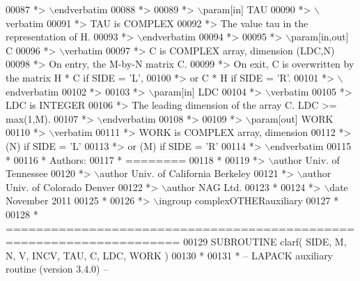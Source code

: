 \begin{DoxyCode}
00087 \textcolor{comment}{*> \(\backslash\)endverbatim}
00088 \textcolor{comment}{*>}
00089 \textcolor{comment}{*> \(\backslash\)param[in] TAU}
00090 \textcolor{comment}{*> \(\backslash\)verbatim}
00091 \textcolor{comment}{*>          TAU is COMPLEX}
00092 \textcolor{comment}{*>          The value tau in the representation of H.}
00093 \textcolor{comment}{*> \(\backslash\)endverbatim}
00094 \textcolor{comment}{*>}
00095 \textcolor{comment}{*> \(\backslash\)param[in,out] C}
00096 \textcolor{comment}{*> \(\backslash\)verbatim}
00097 \textcolor{comment}{*>          C is COMPLEX array, dimension (LDC,N)}
00098 \textcolor{comment}{*>          On entry, the M-by-N matrix C.}
00099 \textcolor{comment}{*>          On exit, C is overwritten by the matrix H * C if SIDE = 'L',}
00100 \textcolor{comment}{*>          or C * H if SIDE = 'R'.}
00101 \textcolor{comment}{*> \(\backslash\)endverbatim}
00102 \textcolor{comment}{*>}
00103 \textcolor{comment}{*> \(\backslash\)param[in] LDC}
00104 \textcolor{comment}{*> \(\backslash\)verbatim}
00105 \textcolor{comment}{*>          LDC is INTEGER}
00106 \textcolor{comment}{*>          The leading dimension of the array C. LDC >= max(1,M).}
00107 \textcolor{comment}{*> \(\backslash\)endverbatim}
00108 \textcolor{comment}{*>}
00109 \textcolor{comment}{*> \(\backslash\)param[out] WORK}
00110 \textcolor{comment}{*> \(\backslash\)verbatim}
00111 \textcolor{comment}{*>          WORK is COMPLEX array, dimension}
00112 \textcolor{comment}{*>                         (N) if SIDE = 'L'}
00113 \textcolor{comment}{*>                      or (M) if SIDE = 'R'}
00114 \textcolor{comment}{*> \(\backslash\)endverbatim}
00115 \textcolor{comment}{*}
00116 \textcolor{comment}{*  Authors:}
00117 \textcolor{comment}{*  ========}
00118 \textcolor{comment}{*}
00119 \textcolor{comment}{*> \(\backslash\)author Univ. of Tennessee }
00120 \textcolor{comment}{*> \(\backslash\)author Univ. of California Berkeley }
00121 \textcolor{comment}{*> \(\backslash\)author Univ. of Colorado Denver }
00122 \textcolor{comment}{*> \(\backslash\)author NAG Ltd. }
00123 \textcolor{comment}{*}
00124 \textcolor{comment}{*> \(\backslash\)date November 2011}
00125 \textcolor{comment}{*}
00126 \textcolor{comment}{*> \(\backslash\)ingroup complexOTHERauxiliary}
00127 \textcolor{comment}{*}
00128 \textcolor{comment}{*  =====================================================================}
00129 \textcolor{keyword}{      SUBROUTINE }clarf( SIDE, M, N, V, INCV, TAU, C, LDC, WORK )
00130 \textcolor{comment}{*}
00131 \textcolor{comment}{*  -- LAPACK auxiliary routine (version 3.4.0) --}

\end{DoxyCode}
